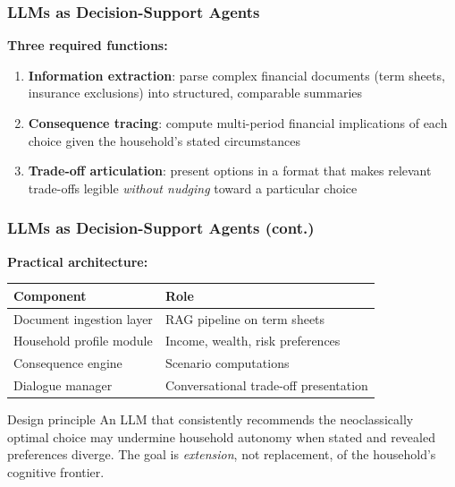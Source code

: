 \documentclass[9pt,t]{beamer}
\begin{document}
\begin{frame}
\frametitle{LLMs as Decision-Support Agents}

\textbf{Three required functions:}
\begin{enumerate}
  \item \textbf{Information extraction}: parse complex financial documents (term sheets, insurance exclusions) into structured, comparable summaries
  \item \textbf{Consequence tracing}: compute multi-period financial implications of each choice given the household's stated circumstances
  \item \textbf{Trade-off articulation}: present options in a format that makes relevant trade-offs legible \emph{without nudging} toward a particular choice
\end{enumerate}
\end{frame}

\begin{frame}
\frametitle{LLMs as Decision-Support Agents (cont.)}

\textbf{Practical architecture:}
\begin{center}
\begin{tabular}{ll}
\toprule
Component & Role \\
\midrule
Document ingestion layer & RAG pipeline on term sheets \\
Household profile module & Income, wealth, risk preferences \\
Consequence engine & Scenario computations \\
Dialogue manager & Conversational trade-off presentation \\
\bottomrule
\end{tabular}
\end{center}

\medskip
\begin{alertblock}{Design principle}
  An LLM that consistently recommends the neoclassically optimal choice may undermine
  household autonomy when stated and revealed preferences diverge. The goal is \emph{extension},
  not replacement, of the household's cognitive frontier.
\end{alertblock}
\end{frame}
\end{document}
